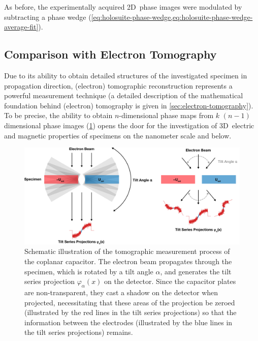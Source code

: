 As before, the experimentally acquired 2D~phase images were modulated by subtracting a phase wedge (\cref{eq:holosuite-phase-wedge,eq:holosuite-phase-wedge-average-fit}).
\newpage
\subsection{Comparison with Electron Tomography} \label{ssec:capacitor-SIMP-tomography-comparison}
Due to its ability to obtain detailed structures of the investigated specimen in propagation direction, (electron) tomographic reconstruction represents a powerful measurement technique (a detailed description of the mathematical foundation behind (electron) tomography is given in \cref{sec:electron-tomography}). To be precise, the ability to obtain $n$-dimensional phase maps from $k$ $\left(n - 1\right)$ dimensional phase images (\cref{fig:TEM-tomography-capacitor-setup}) opens the door for the investigation of 3D~electric and magnetic properties of specimens on the nanometer scale and below.
\begin{figure}[H]
	\centering
	\includegraphics[width=\textwidth]{Figures/Schematics/Theoretical Foundations/TEM-tomography-capacitor-setup.pdf}
	\caption{Schematic illustration of the tomographic measurement process of the coplanar capacitor. The electron beam propagates through the specimen, which is rotated by a tilt angle $\alpha$, and generates the tilt series projection $\varphi_{\alpha}\left(x\right)$ on the detector. Since the capacitor plates are non-transparent, they cast a shadow on the detector when projected, necessitating that these areas of the projection be zeroed (illustrated by the red lines in the tilt series projections) so that the information between the electrodes (illustrated by the blue lines in the tilt series projections) remains.}
	\label{fig:TEM-tomography-capacitor-setup}
\end{figure}
